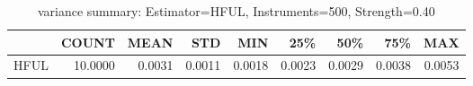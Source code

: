 \begin{table}[ht]
\centering
\caption{variance summary: Estimator=HFUL, Instruments=500, Strength=0.40}
\begin{tabular}{lrrrrrrrr}
\toprule
 & COUNT & MEAN & STD & MIN & 25\% & 50\% & 75\% & MAX \\
\midrule
HFUL & 10.0000 & 0.0031 & 0.0011 & 0.0018 & 0.0023 & 0.0029 & 0.0038 & 0.0053 \\
\bottomrule
\end{tabular}
\end{table}
